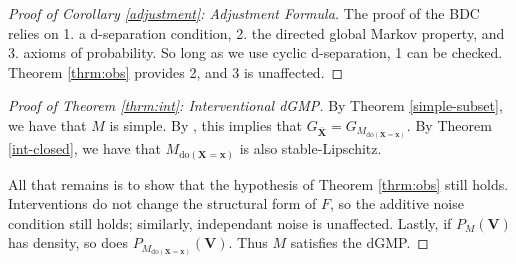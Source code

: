 \documentclass[12pt]{article}
\begin{document}

\begin{proof}[Proof of Corollary \ref{adjustment}: Adjustment Formula]
The proof of the BDC relies on 1. a d-separation condition, 2. the directed global Markov property, and 3. axioms of probability. So long as we use cyclic d-separation, 1 can be checked. Theorem \ref{thrm:obs} provides 2, and 3 is unaffected.
\end{proof}



\begin{proof}[Proof of Theorem \ref{thrm:int}: Interventional dGMP]
By Theorem \ref{simple-subset}, we have that $M$ is simple.
By \cite{Foundations}, this implies that $G_{\overline{\mathbf{X}}}=G_{M_{\text{do}(\mathbf{X}=\mathbf{x})}}$.
By Theorem \ref{int-closed}, we have that $M_{\text{do}(\mathbf{X}=\mathbf{x})}$ is also stable-Lipschitz.

All that remains is to show that the hypothesis of Theorem \ref{thrm:obs} still holds. Interventions do not change the structural form of $F$, so the additive noise condition still holds; similarly, independant noise is unaffected. Lastly, if $P_M(\mathbf{V})$ has density, so does $P_{M_{\text{do}(\mathbf{X}=\mathbf{x})}}(\mathbf{V})$.
Thus $M$ satisfies the dGMP.
\end{proof}

\end{document}
